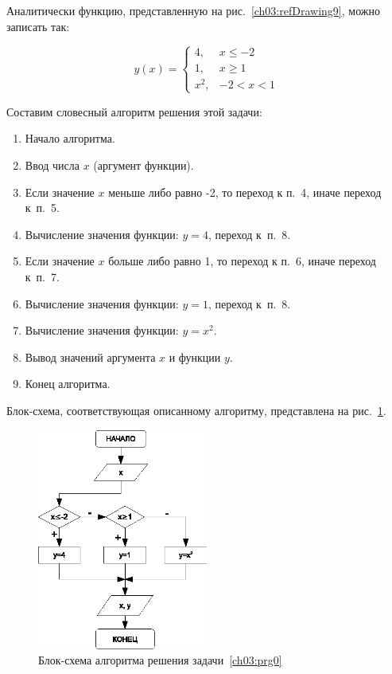 Аналитически функцию, представленную на рис.~\ref{ch03:refDrawing9}, можно записать так:

\begin{equation*}
y(x)=\left\{\begin{matrix}
4, & x\leqslant -2\\
1, & x\geqslant 1\\
x^2, & -2<x<1
\end{matrix}\right.
\end{equation*}

Составим словесный алгоритм решения этой задачи:

\begin{enumerate}
\item Начало алгоритма.
\item Ввод числа $x$ (аргумент функции).
\item Если значение $x$ меньше либо равно -2, то переход к п.~4, иначе переход к~п.~5.
\item Вычисление значения функции: $y=4$, переход к~п.~8.
\item Если значение $x$ больше либо равно 1, то переход к п.~6, иначе переход к~п.~7.
\item Вычисление значения функции: $y=1$, переход к~п.~8.
\item Вычисление значения функции: $y=x^2$.
\item Вывод значений аргумента $x$ и функции $y$.
\item Конец алгоритма.
\end{enumerate}

Блок-схема, соответствующая описанному алгоритму, представлена на рис.~\ref{ch03:refDrawing10}.

\begin{figure}[htb]
\begin{center}
\includegraphics[width=0.5\textwidth]{img/ris_3_11}
\caption{Блок-схема алгоритма решения задачи~\ref{ch03:prg0}}
\label{ch03:refDrawing10}
\end{center}
\end{figure}

